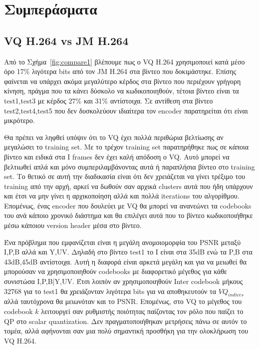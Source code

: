 ﻿\chapter{Συμπεράσματα}
\label{chapter:chap7}

\section{VQ H.264 vs JM H.264}
\label{section:sect63}

\indent Από το Σχήμα~\ref{fig:compare1} βλέπουμε πως ο VQ H.264 χρησιμοποιεί κατά μέσο όρο 17\% λιγότερα bits από τον JM H.264 στα βίντεο που δοκιμάστηκε. Επίσης φαίνεται να υπάρχει ακόμα μεγαλύτερο κέρδος στα βίντεο που περιέχουν γρήγορη κίνηση, πράγμα που τα κάνει δύσκολο να κωδικοποιηθούν, τέτοια βίντεο είναι τα test1,test3 με κέρδος 27\% και 31\% αντίστοιχα. Σε αντίθεση στα βίντεο test2,test4,test5 που δεν δυσκολεύουν ιδιαίτερα τον encoder παρατηρείται ότι είναι μικρότερο.

\indent Θα πρέπει να ληφθεί υπόψιν  ότι το VQ έχει πολλά περιθώρια βελτίωσης αν μεγαλώσει το training set. Με το τρέχον training set παρατηρήθηκε πως σε κάποια βίντεο και ειδικά στα I frames δεν έχει καλή απόδοση ο VQ. Αυτό μπορεί να βελτιωθεί απλά και μόνο συμπεριλαμβάνοντας αυτά ή παραπλήσια βίντεο στο training set. Το θετικό σε αυτή την διαδικασία είναι ότι δεν χρειάζεται να γίνει τρέξιμο του training από την αρχή, αρκεί να δωθούν σαν αρχικά clusters αυτά που ήδη υπάρχουν και έτσι να  μην γίνει η αρχικοποίηση αλλά και πολλά iterations του αλγορίθμου. Επομένως, ένας encoder που δουλεύει με VQ θα μπορεί να ανανεώνει τα codebooks του ανά κάποιο χρονικό διάστημα και θα επιλέγει αυτά που το βίντεο κωδικοποιήθηκε μέσω κάποιου version header μέσα στο βίντεο.

\indent Ένα πρόβλημα που εμφανίζεται είναι η μεγάλη ανομοιομορφία του PSNR μεταξύ I,P,B αλλά και Y,UV. Δηλαδή στο βίντεο test1  το I είναι στα 35dB ενώ τα P,B στα 43dB,45dB αντίστοιχα. Αυτή η διαφορά είναι αρκετά μεγάλη και για να μειωθεί θα μπορούσαν να χρησιμοποιηθούν codebooks με διαφορετικό μέγεθος για κάθε συνιστώσα I,P,B|Y,UV. Έτσι λοιπόν αν χρησιμοποιηθούν Inter codebook μήκους 32768 για το test1 θα χρειάζονταν λιγότερα bits για να αποθηκευτούν  τα $VQ_{indices}$ αλλά ταυτόχρονα θα μειωνόταν και το PSNR. Επομένως, στο VQ το μέγεθος του codebook $k$ λειτουργεί σαν ρυθμιστής ποιότητας παίζοντας τον ρόλο που παίζει το QP στο scalar quantization. Δεν πραγματοποιήθηκαν μετρήσεις πάνω σε αυτόν το τομέα, αλλά αφήνονται σαν μια πολύ σημαντική προσθήκη για την ολοκλήρωση του VQ H.264.

